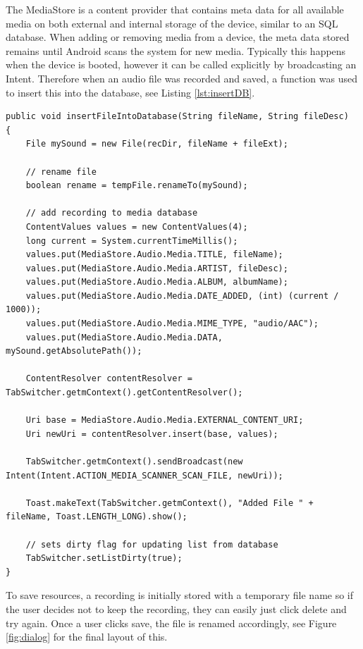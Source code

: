 \documentclass[conference]{acmsiggraph}
\begin{document}
The MediaStore is a content provider that contains meta data for all available media on both external and internal storage of the device, similar to an SQL database. When adding or removing media from a device, the meta data stored remains until Android scans the system for new media. Typically this happens when the device is booted, however it can be called explicitly by broadcasting an Intent. \cite{MediaStore} Therefore when an audio file was recorded and saved, a function was used to insert this into the database, see Listing \ref{lst:insertDB}.

\newpage

\begin{lstlisting}[label = {lst:insertDB}, caption={Inserting File into MediaStore Database}]
public void insertFileIntoDatabase(String fileName, String fileDesc)
{
    File mySound = new File(recDir, fileName + fileExt);
    	
    // rename file
    boolean rename = tempFile.renameTo(mySound);
    	
   	// add recording to media database
   	ContentValues values = new ContentValues(4);
   	long current = System.currentTimeMillis();
   	values.put(MediaStore.Audio.Media.TITLE, fileName);
   	values.put(MediaStore.Audio.Media.ARTIST, fileDesc);
   	values.put(MediaStore.Audio.Media.ALBUM, albumName);
   	values.put(MediaStore.Audio.Media.DATE_ADDED, (int) (current / 1000));
    values.put(MediaStore.Audio.Media.MIME_TYPE, "audio/AAC");
   	values.put(MediaStore.Audio.Media.DATA, mySound.getAbsolutePath());
    	
   	ContentResolver contentResolver = TabSwitcher.getmContext().getContentResolver();
    	
   	Uri base = MediaStore.Audio.Media.EXTERNAL_CONTENT_URI;
   	Uri newUri = contentResolver.insert(base, values);
    	
   	TabSwitcher.getmContext().sendBroadcast(new Intent(Intent.ACTION_MEDIA_SCANNER_SCAN_FILE, newUri));
   	
   	Toast.makeText(TabSwitcher.getmContext(), "Added File " + fileName, Toast.LENGTH_LONG).show();
    	
   	// sets dirty flag for updating list from database
   	TabSwitcher.setListDirty(true);
}
\end{lstlisting}

To save resources, a recording is initially stored with a temporary file name so if the user decides not to keep the recording, they can easily just click delete and try again. Once a user clicks save, the file is renamed accordingly, see Figure \ref{fig:dialog} for the final layout of this.
\end{document}
